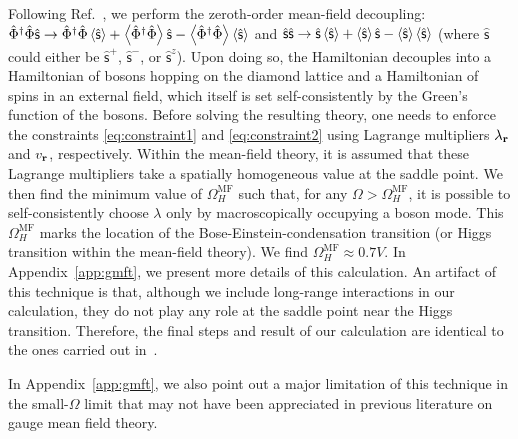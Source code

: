 \documentclass[twocolumn,superscriptaddress,amsmath,amssymb,aps,prx,nofootinbib]{revtex4-2}
\begin{document}
Following Ref.~\cite{savary2012coulombic}, we perform the  zeroth-order mean-field decoupling: $\hat{\Phi}^\dagger \hat{\Phi} \hat{\mathsf{s}} \rightarrow \hat{\Phi}^\dagger \hat{\Phi} \expval{\hat{\mathsf{s}}}+\expval{\hat{\Phi}^\dagger \hat{\Phi}} \hat{\mathsf{s}} -\expval{\hat{\Phi}^\dagger \hat{\Phi}} \expval{\hat{\mathsf{s}}} $ and $\hat{\mathsf{s}} \hat{\mathsf{s}}\rightarrow \hat{\mathsf{s}}\expval{\hat{\mathsf{s}}}+\expval{\hat{\mathsf{s}}}\hat{\mathsf{s}}-\expval{\hat{\mathsf{s}}}\expval{\hat{\mathsf{s}}}$ (where $\hat{\mathsf{s}}$ could either be $\hat{\mathsf{s}}^+$, $\hat{\mathsf{s}}^-$, or $\hat{\mathsf{s}}^z$). Upon doing so, the Hamiltonian decouples into  a Hamiltonian of bosons hopping on the diamond lattice and a Hamiltonian of spins in an external field, which itself is set self-consistently by the Green's function of the bosons. Before solving the resulting theory, one needs to enforce the constraints \eqref{eq:constraint1} and \eqref{eq:constraint2} using Lagrange multipliers $\lambda_{\vb{r}}$ and $v_{\vb{r}}$, respectively. Within the mean-field theory, it is assumed that these Lagrange multipliers take a spatially homogeneous value at the saddle point. 
We then find  the minimum value of $\Omega^{\text{MF}}_H$ such that, for any $\Omega>\Omega^{\text{MF}}_H$, it is possible to self-consistently choose $\lambda$ only by macroscopically occupying a boson mode. 
This $\Omega^{\text{MF}}_H$ marks the location of the Bose-Einstein-condensation transition (or Higgs transition within the mean-field theory). We find $\Omega^{\text{MF}}_H\approx 0.7 V$. In Appendix~\ref{app:gmft}, we present more details of this calculation. An artifact of this technique is that, although we include long-range interactions in our calculation, they do not play any role at the saddle point near the Higgs transition. Therefore, the final steps and result of our calculation are identical to the ones carried out in~\cite{savary2017disorder}. 

In Appendix~\ref{app:gmft}, we also point out a major limitation of this technique in the small-$\Omega$ limit that may not have been appreciated in previous literature on gauge mean field theory.
\end{document}
